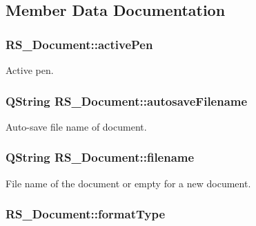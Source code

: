 \subsection{Member Data Documentation}
\hypertarget{classRS__Document_a54935def017bc5ebab2dd56b3e7e106a}{
\subsubsection[{active\-Pen}]{ R\-S\-\_\-\-Document\-::active\-Pen\hspace{0.3cm}{\ttfamily [protected]}}}\label{classRS__Document_a54935def017bc5ebab2dd56b3e7e106a}
Active pen. \hypertarget{classRS__Document_a5969ebd6f6d140a940d2c3e35048622b}{
\subsubsection[{autosave\-Filename}]{\setlength{\rightskip}{0pt plus 5cm}Q\-String R\-S\-\_\-\-Document\-::autosave\-Filename\hspace{0.3cm}{\ttfamily [protected]}}}\label{classRS__Document_a5969ebd6f6d140a940d2c3e35048622b}
Auto-\/save file name of document. \hypertarget{classRS__Document_aefd3d25d96ec31943bdfd1453031a423}{
\subsubsection[{filename}]{\setlength{\rightskip}{0pt plus 5cm}Q\-String R\-S\-\_\-\-Document\-::filename\hspace{0.3cm}{\ttfamily [protected]}}}\label{classRS__Document_aefd3d25d96ec31943bdfd1453031a423}
File name of the document or empty for a new document. \hypertarget{classRS__Document_a3039f46a236bb1c3f0208c5f304b3f4b}{
\subsubsection[{format\-Type}]{ R\-S\-\_\-\-Document\-::format\-Type\hspace{0.3cm}{\ttfamily [protected]}}}\label{classRS__Document_a3039f46a236bb1c3f0208c5f304b3f4b}
